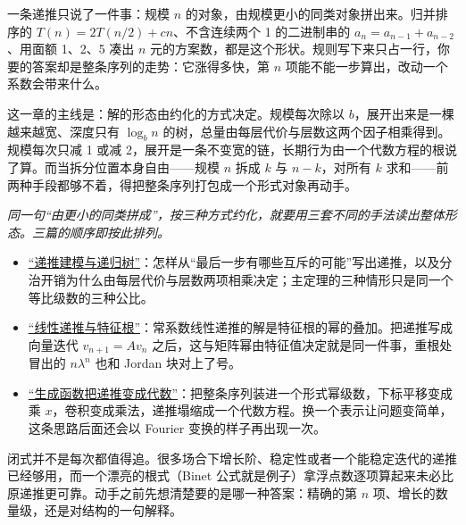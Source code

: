 一条递推只说了一件事：规模 \(n\) 的对象，由规模更小的同类对象拼出来。归并排序的 \(T(n)=2T(n/2)+cn\)、不含连续两个 1 的二进制串的 \(a_n=a_{n-1}+a_{n-2}\)、用面额 1、2、5 凑出 \(n\) 元的方案数，都是这个形状。规则写下来只占一行，你要的答案却是整条序列的走势：它涨得多快，第 \(n\) 项能不能一步算出，改动一个系数会带来什么。

这一章的主线是：解的形态由约化的方式决定。规模每次除以 \(b\)，展开出来是一棵越来越宽、深度只有 \(\log_b n\) 的树，总量由每层代价与层数这两个因子相乘得到。规模每次只减 1 或减 2，展开是一条不变宽的链，长期行为由一个代数方程的根说了算。而当拆分位置本身自由——规模 \(n\) 拆成 \(k\) 与 \(n-k\)，对所有 \(k\) 求和——前两种手段都够不着，得把整条序列打包成一个形式对象再动手。

\begin{center}

\emph{同一句``由更小的同类拼成''，按三种方式约化，就要用三套不同的手法读出整体形态。三篇的顺序即按此排列。}
\end{center}

\begin{itemize}
\tightlist
\item \hyperref[sec:04-Discrete-Mathematics/02-Recurrences/01]{``递推建模与递归树''}：怎样从``最后一步有哪些互斥的可能''写出递推，以及分治开销为什么由每层代价与层数两项相乘决定；主定理的三种情形只是同一个等比级数的三种公比。
\item \hyperref[sec:04-Discrete-Mathematics/02-Recurrences/02]{``线性递推与特征根''}：常系数线性递推的解是特征根的幂的叠加。把递推写成向量迭代 \(v_{n+1}=Av_n\) 之后，这与矩阵幂由特征值决定就是同一件事，重根处冒出的 \(n\lambda^n\) 也和 Jordan 块对上了号。
\item \hyperref[sec:04-Discrete-Mathematics/02-Recurrences/03]{``生成函数把递推变成代数''}：把整条序列装进一个形式幂级数，下标平移变成乘 \(x\)，卷积变成乘法，递推塌缩成一个代数方程。换一个表示让问题变简单，这条思路后面还会以 Fourier 变换的样子再出现一次。
\end{itemize}

闭式并不是每次都值得追。很多场合下增长阶、稳定性或者一个能稳定迭代的递推已经够用，而一个漂亮的根式（Binet 公式就是例子）拿浮点数逐项算起来未必比原递推更可靠。动手之前先想清楚要的是哪一种答案：精确的第 \(n\) 项、增长的数量级，还是对结构的一句解释。
